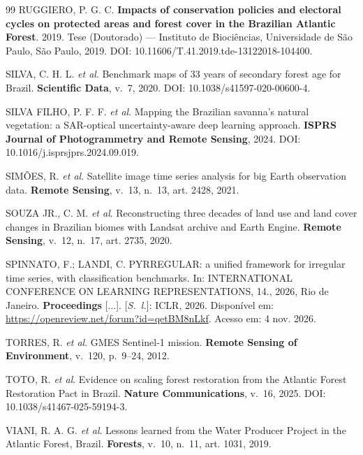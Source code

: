 \documentclass[conference]{IEEEtran}
\begin{document}
\begin{thebibliography}{99}
 RUGGIERO, P. G. C. \textbf{Impacts of conservation policies and electoral cycles on protected areas and forest cover in the Brazilian Atlantic Forest}. 2019. Tese (Doutorado) --- Instituto de Biociências, Universidade de São Paulo, São Paulo, 2019. DOI: 10.11606/T.41.2019.tde-13122018-104400.

 SILVA, C. H. L. \textit{et al}. Benchmark maps of 33 years of secondary forest age for Brazil. \textbf{Scientific Data}, v.~7, 2020. DOI: 10.1038/s41597-020-00600-4.

 SILVA FILHO, P. F. F. \textit{et al}. Mapping the Brazilian savanna's natural vegetation: a SAR-optical uncertainty-aware deep learning approach. \textbf{ISPRS Journal of Photogrammetry and Remote Sensing}, 2024. DOI: 10.1016/j.isprsjprs.2024.09.019.

 SIMÕES, R. \textit{et al}. Satellite image time series analysis for big Earth observation data. \textbf{Remote Sensing}, v.~13, n.~13, art. 2428, 2021.

 SOUZA JR., C. M. \textit{et al}. Reconstructing three decades of land use and land cover changes in Brazilian biomes with Landsat archive and Earth Engine. \textbf{Remote Sensing}, v.~12, n.~17, art. 2735, 2020.

 SPINNATO, F.; LANDI, C. PYRREGULAR: a unified framework for irregular time series, with classification benchmarks. In: INTERNATIONAL CONFERENCE ON LEARNING REPRESENTATIONS, 14., 2026, Rio de Janeiro. \textbf{Proceedings} [...]. [\textit{S.~l.}]: ICLR, 2026. Disponível em: \url{https://openreview.net/forum?id=qetBM8nLkf}. Acesso em: 4 nov. 2026.

 TORRES, R. \textit{et al}. GMES Sentinel-1 mission. \textbf{Remote Sensing of Environment}, v.~120, p.~9--24, 2012.

 TOTO, R. \textit{et al}. Evidence on scaling forest restoration from the Atlantic Forest Restoration Pact in Brazil. \textbf{Nature Communications}, v.~16, 2025. DOI: 10.1038/s41467-025-59194-3.

 VIANI, R. A. G. \textit{et al}. Lessons learned from the Water Producer Project in the Atlantic Forest, Brazil. \textbf{Forests}, v.~10, n.~11, art. 1031, 2019.


\end{thebibliography}
\end{document}
